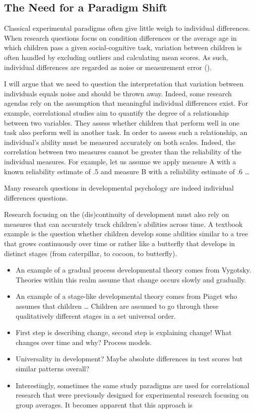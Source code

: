 \documentclass[
]{scrbook}
\begin{document}
\subsection{The Need for a Paradigm Shift}\label{the-need-for-a-paradigm-shift}

Classical experimental paradigms often give little weigh to individual differences. When research questions focus on condition differences or the average age in which children pass a given social-cognitive task, variation between children is often handled by excluding outliers and calculating mean scores. As such, individual differences are regarded as noise or measurement error ().

I will argue that we need to question the interpretation that variation between individuals equals noise and should be thrown away. Indeed, some research agendas rely on the assumption that meaningful individual differences exist. For example, correlational studies aim to quantify the degree of a relationship between two variables. They assess whether children that perform well in one task also perform well in another task. In order to assess such a relationship, an individual's ability must be measured accurately on both scales. Indeed, the correlation between two measures cannot be greater than the reliability of the individual measures. For example, let us assume we apply measure A with a known reliability estimate of .5 and measure B with a reliability estimate of .6 \ldots{}

Many research questions in developmental psychology are indeed individual differences questions.

Research focusing on the (dis)continuity of development must also rely on measures that can accurately track children's abilities across time. A textbook example is the question whether children develop some abilities similar to a tree that grows continuously over time or rather like a butterfly that develops in distinct stages (from caterpillar, to cocoon, to butterfly).

\begin{itemize}
\item
  An example of a gradual process developmental theory comes from Vygotsky. Theories within this realm assume that change occurs slowly and gradually.
\item
  An example of a stage-like developmental theory comes from Piaget who assumes that children \ldots{} Children are assumed to go through these qualitatively different stages in a set universal order.
\item
  First step is describing change, second step is explaining change! What changes over time and why? Process models.
\item
  Universality in development? Maybe absolute differences in test scores but similar patterns overall?
\item
  Interestingly, sometimes the same study paradigms are used for correlational research that were previously designed for experimental research focusing on group averages. It becomes apparent that this approach is
\end{itemize}
\end{document}
